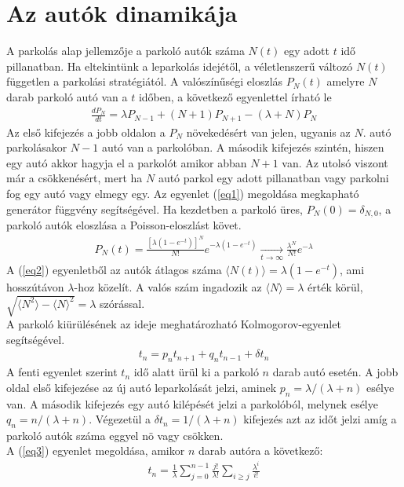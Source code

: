\documentclass{article}
\begin{document}
	\section{Az autók dinamikája}
	A parkolás alap jellemzője a parkoló autók száma $N(t)$ egy adott $t$ idő pillanatban. Ha eltekintünk a leparkolás idejétől, a véletlenszerű változó $N(t)$ független a parkolási stratégiától. A valószínűségi eloszlás $P_N(t)$ amelyre $N$ darab parkoló autó van a $t$ időben, a következő egyenlettel írható le
	\begin{align}
		\label{eq1}
		\frac{dP_N}{dt} = \lambda P_{N-1}+(N+1)P_{N+1}-(\lambda + N)P_N
	\end{align}
	Az első kifejezés a jobb oldalon a $P_N$ növekedésért van jelen, ugyanis az $N$. autó parkolásakor $N-1$ autó van a parkolóban. A második kifejezés szintén, hiszen egy autó akkor hagyja el a parkolót amikor abban $N+1$ van. Az utolsó viszont már a csökkenésért, mert ha $N$ autó parkol egy adott pillanatban vagy parkolni fog egy autó vagy elmegy egy.
	Az egyenlet (\ref{eq1}) megoldása megkapható generátor függvény segítségével. Ha kezdetben a parkoló üres, $P_N(0)=\delta_{N,0}$, a parkoló autók eloszlása a Poisson-eloszlást követ.
	\begin{align}
		\label{eq2}
		P_N(t) = \frac{[\lambda (1-e^{-t})]^N}{N!}e^{-\lambda(1-e^{-t})}\xrightarrow[t\to\infty]{}\frac{\lambda^N}{N!}e^{-\lambda}
	\end{align}
	A (\ref{eq2}) egyenletből az autók átlagos száma $\langle N(t)\rangle = \lambda(1-e^{-t})$, ami hosszútávon $\lambda$-hoz közelít. A valós szám ingadozik az $\langle N \rangle = \lambda$ érték körül, $\sqrt{\langle N^2\rangle - \langle N\rangle^2} = \lambda$ szórással.\\
	A parkoló kiürülésének az ideje meghatározható Kolmogorov-egyenlet segítségével.
	\begin{align}
		\label{eq3}
		t_n=p_nt_{n+1}+q_nt_{n-1}+\delta t_n
	\end{align}
	A fenti egyenlet szerint $t_n$ idő alatt ürül ki a parkoló $n$ darab autó esetén. A jobb oldal első kifejezése az új autó leparkolását jelzi, aminek $p_n={\lambda}/{(\lambda+n)}$ esélye van. A második kifejezés egy autó kilépését jelzi a parkolóból, melynek esélye $q_n={n}/{(\lambda+n)}$.
	Végezetül a $\delta t_n=1/{(\lambda+n)}$ kifejezés azt az időt jelzi amíg a parkoló autók száma eggyel nö vagy csökken.\\
	A (\ref{eq3}) egyenlet megoldása, amikor $n$ darab autóra a következő:
	\begin{align}
		t_n=\frac{1}{\lambda}\sum_{j=0}^{n-1}\frac{j!}{\lambda!}\sum_{i \geqslant j}\frac{\lambda^i}{i!}
	\end{align}
\end{document}
